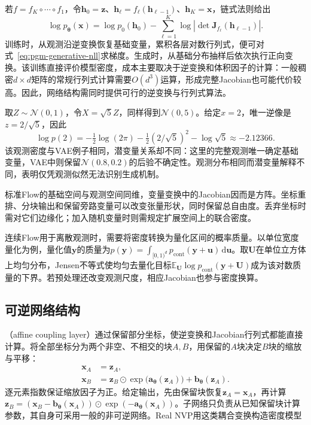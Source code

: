 若$f=f_K\circ\cdots\circ f_1$，令$\bm{h}_0=\bm{z}$、$\bm{h}_{\ell}=f_{\ell}(\bm{h}_{\ell-1})$、$\bm{h}_K=\bm{x}$，链式法则给出
\begin{equation}
  \label{eq:pgm-generative-flow-composition}
  \log p_{\bm{\theta}}(\bm{x})
  =\log p_0(\bm{h}_0)
   -\sum_{\ell=1}^{K}
      \log|\det\bm{J}_{f_{\ell}}(\bm{h}_{\ell-1})|.
\end{equation}
训练时，从观测沿逆变换恢复基础变量，累积各层对数行列式，便可对式~\eqref{eq:pgm-generative-nll}求梯度。生成时，从基础分布抽样后依次执行正向变换。该训练直接评价模型密度，成本主要取决于逆变换和体积因子的计算：一般稠密$d\times d$矩阵的常规行列式计算需要$O(d^3)$运算，形成完整Jacobian也可能代价较高。因此，网络结构需同时提供可行的逆变换与行列式算法。

\begin{example}[用缩放得到相同的一维密度]
  \label{ex:pgm-generative-gaussian-flow}
  取$Z\sim\mathcal{N}(0,1)$，令$X=\sqrt{5}Z$，同样得到$\mathcal{N}(0,5)$。给定$x=2$，唯一逆像是$z=2/\sqrt5$，因此
  \[
    \log p(2)=-\tfrac12\log(2\pi)
              -\tfrac12(2/\sqrt5)^2-\log\sqrt5
             \approx-2.12366.
  \]
  该观测密度与VAE例子相同，潜变量关系却不同：这里的完整观测唯一确定基础变量，VAE中则保留$\mathcal{N}(0.8,0.2)$的后验不确定性。观测分布相同而潜变量解释不同，表明仅凭观测似然无法识别生成机制。
\end{example}

标准Flow的基础空间与观测空间同维，变量变换中的Jacobian因而是方阵。坐标重排、分块输出和保留旁路变量可以改变张量形状，同时保留总自由度。丢弃坐标时需对它们边缘化；加入随机变量时则需规定扩展空间上的联合密度。

连续Flow用于离散观测时，需要将密度转换为量化区间的概率质量。以单位宽度量化为例，量化值$\bm{y}$的质量为$p(\bm{y})=\int_{[0,1)^d}p_{\mathrm{cont}}(\bm{y}+\bm{u})\,\mathrm{d}\bm{u}$。取$\bm{U}$在单位立方体上均匀分布，Jensen不等式使均匀去量化目标$\mathbb{E}_{\bm{U}}\log p_{\mathrm{cont}}(\bm{y}+\bm{U})$成为该对数质量的下界。若预处理还改变观测尺度，相应Jacobian也参与密度换算。

\subsection{可逆网络结构}
\label{sec:pgm-generative-invertible-networks}

（affine coupling layer）通过保留部分坐标，使逆变换和Jacobian行列式都能直接计算。将全部坐标分为两个非空、不相交的块$A,B$，用保留的$A$块决定$B$块的缩放与平移：
\begin{equation}
  \label{eq:pgm-generative-coupling}
  \begin{aligned}
    \bm{x}_A&=\bm{z}_A,\\
    \bm{x}_B&=\bm{z}_B\odot
       \exp\bigl(\bm{a}_{\bm{\theta}}(\bm{z}_A)\bigr)
          +\bm{b}_{\bm{\theta}}(\bm{z}_A).
  \end{aligned}
\end{equation}
逐元素指数保证缩放因子为正。给定输出，先由保留块恢复$\bm{z}_A=\bm{x}_A$，再计算$\bm{z}_B=(\bm{x}_B-\bm{b}_{\bm{\theta}}(\bm{x}_A))\odot\exp(-\bm{a}_{\bm{\theta}}(\bm{x}_A))$。子网络只负责从已知保留块计算参数，其自身可采用一般的非可逆网络。Real NVP用这类耦合变换构造密度模型

